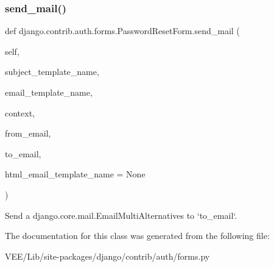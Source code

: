 \subsubsection{\texorpdfstring{send\+\_\+mail()}{send\_mail()}}
{\footnotesize\ttfamily def django.\+contrib.\+auth.\+forms.\+Password\+Reset\+Form.\+send\+\_\+mail (\begin{DoxyParamCaption}\item[{}]{self,  }\item[{}]{subject\+\_\+template\+\_\+name,  }\item[{}]{email\+\_\+template\+\_\+name,  }\item[{}]{context,  }\item[{}]{from\+\_\+email,  }\item[{}]{to\+\_\+email,  }\item[{}]{html\+\_\+email\+\_\+template\+\_\+name = {\ttfamily None} }\end{DoxyParamCaption})}

\begin{DoxyVerb}Send a django.core.mail.EmailMultiAlternatives to `to_email`.
\end{DoxyVerb}
 

The documentation for this class was generated from the following file\+:\begin{DoxyCompactItemize}
\item 
V\+E\+E/\+Lib/site-\/packages/django/contrib/auth/forms.\+py\end{DoxyCompactItemize}

